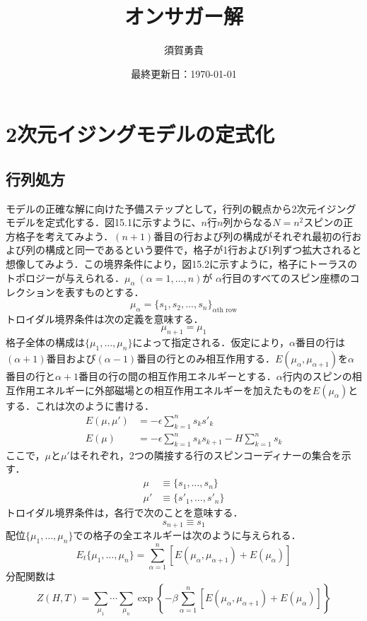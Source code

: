 \documentclass[a4paper,11pt]{jsarticle}
\begin{document}
\title{オンサガー解}
\author{須賀勇貴}
\date{最終更新日：\today}
\maketitle

\section{2次元イジングモデルの定式化}

\subsection*{行列処方}
モデルの正確な解に向けた予備ステップとして，行列の観点から2次元イジングモデルを定式化する．図15.1に示すように、$n$行$n$列からなる$N = n^2$スピンの正方格子を考えてみよう．$(n+1)$番目の行および列の構成がそれぞれ最初の行および列の構成と同一であるという要件で，格子が1行および1列ずつ拡大されると想像してみよう．この境界条件により，図15.2に示すように，格子にトーラスのトポロジーが与えられる．$\mu_{\alpha} \ (\alpha = 1, \dots, n)$が $\alpha$行目のすべてのスピン座標のコレクションを表すものとする．
\begin{equation}
  \mu_{\alpha} 
  = \{s_1, s_2, ..., s_n \}_{\alpha \text{th row}}
\end{equation}
トロイダル境界条件は次の定義を意味する．
\begin{equation}
  \mu_{n+1} = \mu_1
\end{equation}
格子全体の構成は$\{\mu_1, \dots, \mu_n \}$によって指定される．仮定により，$\alpha$番目の行は$(\alpha + 1)$番目および$(\alpha -1)$番目の行とのみ相互作用する．$E(\mu_{\alpha}, \mu_{\alpha+1})$を$\alpha$番目の行と$\alpha+1$番目の行の間の相互作用エネルギーとする．$\alpha$行内のスピンの相互作用エネルギーに外部磁場との相互作用エネルギーを加えたものを$E(\mu_{\alpha})$とする．これは次のように書ける．
\begin{align}
  E(\mu, \mu') 
  &= -\epsilon \sum_{k=1}^n s_k s'_k \\
  E(\mu) 
  &= -\epsilon \sum_{k=1}^n s_k s_{k+1} - H \sum_{k=1}^n s_k
\end{align}
ここで，$\mu$と$\mu'$はそれぞれ，2つの隣接する行のスピンコーディナーの集合を示す．
\begin{align}
  \mu &\equiv \{s_1, \dots, s_n \} \\
  \mu' &\equiv \{s'_1, \dots, s'_n \}
\end{align}
トロイダル境界条件は，各行で次のことを意味する．
\begin{equation}
  s_{n+1} \equiv s_1
\end{equation}
配位$\{\mu_1, \dots, \mu_n \}$での格子の全エネルギーは次のように与えられる．
\begin{equation}
  E_t\{\mu_1, \dots, \mu_n \}
  = \sum_{\alpha=1}^n [E(\mu_{\alpha}, \mu_{\alpha+1}) + E(\mu_{\alpha})]
\end{equation}
分配関数は
\begin{equation}
  Z(H,T) 
  = \sum_{\mu_1} \cdots \sum_{\mu_n} \exp{\left\{ -\beta \sum_{\alpha=1}^n [E(\mu_{\alpha}, \mu_{\alpha+1}) + E(\mu_{\alpha})] \right\}}
\end{equation}
\end{document}
